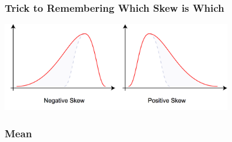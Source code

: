 \documentclass[handout]{beamer}
\newcommand{\blue}[1]{\textcolor{blue2}{#1}}
\begin{document}
\begin{frame}[fragile]
\frametitle{Trick to Remembering Which Skew is Which}

%
%

\begin{center}
\pause\includegraphics[width=10cm]{figure/skew.png}
\end{center}


\end{frame}



%
%
%


\begin{frame}[fragile]
\frametitle{Mean}
%
%
%

\end{frame}
\end{document}
